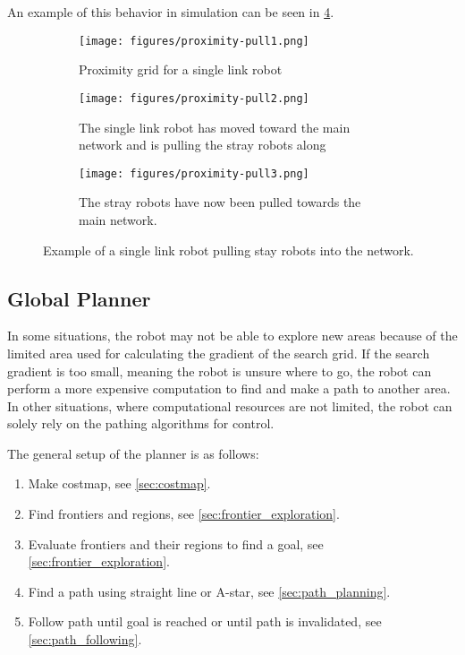An example of this behavior in simulation can be seen in \cref{fig:proximity-pull}.

\begin{figure}[h]
    \begin{center}
        \begin{subfigure}[b]{0.31\textwidth}
            \centering
            \texttt{[image: figures/proximity-pull1.png]}
            \caption{Proximity grid for a {\color{red} single link} robot}
            \label{fig:proximity-pull1}
        \end{subfigure}
        \begin{subfigure}[b]{0.31\textwidth}
            \centering
            \texttt{[image: figures/proximity-pull2.png]}
            \caption{The single link robot has moved toward the main network and is pulling the stray robots along}
            \label{fig:proximity-pull2}
        \end{subfigure}
        \begin{subfigure}[b]{0.31\textwidth}
            \centering
            \texttt{[image: figures/proximity-pull3.png]}
            \caption{The stray robots have now been pulled towards the main network.}
            \label{fig:proximity-pull3}
        \end{subfigure}
    \end{center}
    \caption{Example of a {\color{red} single link} robot pulling stay robots into the network.}\label{fig:proximity-pull}
\end{figure}




\subsection{Global Planner}
In some situations, the robot may not be able to explore new areas because of the limited area used for calculating the gradient of the search grid.
If the search gradient is too small, meaning the robot is unsure where to go, the robot can perform a more expensive computation to find and make a path to another area.
In other situations, where computational resources are not limited, the robot can solely rely on the pathing algorithms for control.

The general setup of the planner is as follows:
\begin{enumerate}
  \item Make costmap, see \cref{sec:costmap}.
  \item Find frontiers and regions, see \cref{sec:frontier_exploration}.
  \item Evaluate frontiers and their regions to find a goal, see \cref{sec:frontier_exploration}.
  \item Find a path using straight line or A-star, see \cref{sec:path_planning}.
  \item Follow path until goal is reached or until path is invalidated, see \cref{sec:path_following}.
\end{enumerate}

